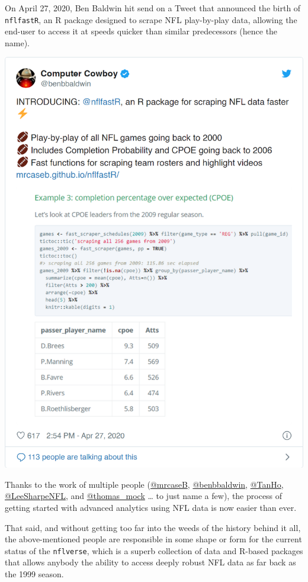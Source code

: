 \documentclass[
  letterpaper,
]{krantz}
\begin{document}
On April 27, 2020, Ben Baldwin hit send on a Tweet that announced the
birth of \texttt{nflfastR}, an R package designed to scrape NFL
play-by-play data, allowing the end-user to access it at speeds quicker
than similar predecessors (hence the name).

\includegraphics[width=1\textwidth,height=\textheight]{./index_files/figure-pdf/ben-baldwin-tweet-1.png}

Thanks to the work of multiple people
(\href{https://twitter.com/mrcaseb}{@mrcaseB},
\href{https://twitter.com/benbbaldwin}{@benbbaldwin},
\href{https://twitter.com/_TanHo}{@TanHo},
\href{https://twitter.com/LeeSharpeNFL}{@LeeSharpeNFL}, and
\href{https://twitter.com/thomas_mock}{@thomas\_mock} \ldots{} to just
name a few), the process of getting started with advanced analytics
using NFL data is now easier than ever.

That said, and without getting too far into the weeds of the history
behind it all, the above-mentioned people are responsible in some shape
or form for the current status of the \texttt{nflverse}, which is a
superb collection of data and R-based packages that allows anybody the
ability to access deeply robust NFL data as far back as the 1999 season.
\end{document}
